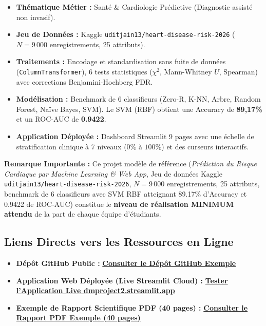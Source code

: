 \documentclass[11pt,a4paper]{article}
\begin{document}
\begin{tcolorbox}[colback=lightgray, colframe=sintefblue, title=\textbf{PROJET MODÈLE : PRÉDICTION DU RISQUE CARDIAQUE PAR DATA MINING}, arc=2mm]
    \begin{itemize}[leftmargin=*]
        \item \textbf{Thématique Métier :} Santé \& Cardiologie Prédictive (Diagnostic assisté non invasif).
        \item \textbf{Jeu de Données :} Kaggle \texttt{uditjain13/heart-disease-risk-2026} ($N = 9\,000$ enregistrements, 25 attributs).
        \item \textbf{Traitements :} Encodage et standardisation sans fuite de données (\texttt{ColumnTransformer}), 6 tests statistiques ($\chi^2$, Mann-Whitney $U$, Spearman) avec corrections Benjamini-Hochberg FDR.
        \item \textbf{Modélisation :} Benchmark de 6 classifieurs (Zero-R, K-NN, Arbre, Random Forest, Naïve Bayes, SVM). Le SVM (RBF) obtient une Accuracy de \textbf{89,17\%} et un ROC-AUC de \textbf{0.9422}.
        \item \textbf{Application Déployée :} Dashboard Streamlit 9 pages avec une échelle de stratification clinique à 7 niveaux ($0\%$ à $100\%$) et des curseurs interactifs.
    \end{itemize}
\end{tcolorbox}

\begin{tcolorbox}[colback=sintefgold!15, colframe=sintefgold!80!black, title=\textbf{ATTENTION — TRAVAIL MINIMUM ATTENDU}, arc=2mm]
    \textbf{Remarque Importante :} Ce projet modèle de référence (\textit{Prédiction du Risque Cardiaque par Machine Learning \& Web App}, Jeu de données Kaggle \texttt{uditjain13/heart-disease-risk-2026}, $N = 9\,000$ enregistrements, 25 attributs, benchmark de 6 classifieurs avec SVM RBF atteignant 89.17\% d'Accuracy et 0.9422 de ROC-AUC) constitue le \textbf{niveau de réalisation MINIMUM attendu} de la part de chaque équipe d'étudiants.
\end{tcolorbox}

\subsection{Liens Directs vers les Ressources en Ligne}
\begin{itemize}[leftmargin=*]
    \item \textbf{Dépôt GitHub Public :} \href{https://github.com/hosniadilemp-a11y/DataMiningProjectExample.git}{\textbf{\color{sintefblue}Consulter le Dépôt GitHub Exemple}}
    \item \textbf{Application Web Déployée (Live Streamlit Cloud) :} \href{https://dmproject2.streamlit.app/}{\textbf{\color{sintefblue}Tester l'Application Live dmproject2.streamlit.app}}
    \item \textbf{Exemple de Rapport Scientifique PDF (40 pages) :} \href{https://github.com/hosniadilemp-a11y/DataMiningProjectExample/blob/main/docs/Rapport_MiniProject.pdf}{\textbf{\color{sintefblue}Consulter le Rapport PDF Exemple (40 pages)}}
\end{itemize}
\end{document}

